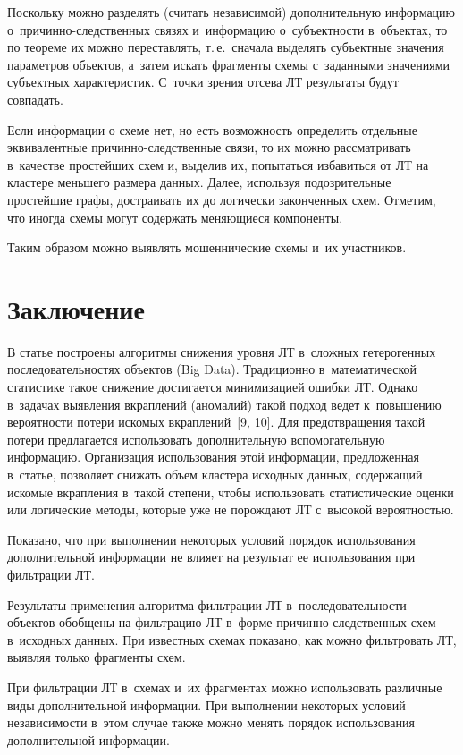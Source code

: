 \begin{multicols}{2}
  Поскольку можно разделять (считать независимой) дополнительную 
информацию о~при\-чин\-но-след\-ст\-вен\-ных связях и~информацию 
о~субъектности в~объектах, то по теореме их можно переставлять, т.\,е.\ сначала 
выделять субъектные значения параметров объектов, а~затем искать фрагменты 
схемы с~заданными значениями субъектных характеристик. С~точки зрения отсева 
ЛТ результаты будут совпадать.
  
  Если информации о схеме нет, но есть возможность определить отдельные 
эквивалентные при\-чин\-но-след\-ст\-вен\-ные связи, то их можно рас\-смат\-ри\-вать 
в~качестве простейших схем и, выделив их, попытаться избавиться от ЛТ на 
кластере меньшего размера данных. Далее, используя подозрительные 
простейшие графы, достраивать их до логически законченных схем. Отметим, что 
иногда схемы могут содержать меняющиеся компоненты. 
  
  Таким образом можно выявлять мошеннические схемы и~их участников.
  
  \section{Заключение}
  
  В статье построены алгоритмы снижения уровня ЛТ в~сложных гетерогенных 
последовательностях объектов (Big Data). Традиционно в~математической 
статистике такое снижение достигается минимизацией ошибки ЛТ. Однако 
в~задачах выявления вкрап\-ле\-ний (аномалий) такой подход ведет к~повышению 
вероятности потери искомых вкрап\-ле\-ний~[9, 10]. Для предотвращения такой 
потери предлагается использовать дополнительную вспомогательную 
информацию. Организация использования этой информации, предложенная 
в~статье, позволяет снижать объем клас\-те\-ра исходных данных, содержащий 
искомые вкрапления в~такой степени, чтобы использовать статистические оценки 
или логические методы, которые уже не по\-рож\-да\-ют ЛТ с~высокой ве\-ро\-ят\-ностью.
  
  Показано, что при выполнении некоторых условий порядок использования 
дополнительной информации не влияет на результат ее использования при 
фильтрации ЛТ.
  
  Результаты применения алгоритма фильтрации ЛТ в~последовательности 
объектов обобщены на фильтрацию ЛТ в~форме при\-чин\-но-след\-ст\-вен\-ных 
схем в~исходных данных. При известных схемах показано, как можно фильтровать 
ЛТ, выявляя только фрагменты схем.
  
  При фильтрации ЛТ в~схемах и~их фрагментах можно использовать различные 
виды дополнительной информации. При выполнении некоторых условий 
независимости в~этом случае также можно менять порядок использования 
дополнительной информации.
  

\end{multicols}
